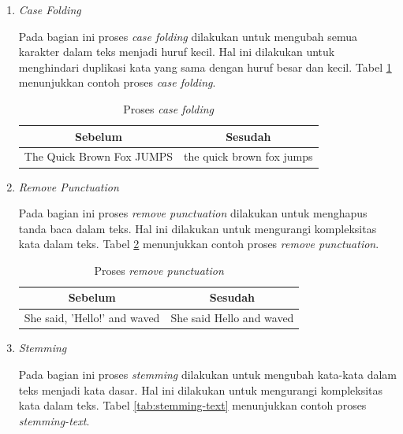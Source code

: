 \begin{enumerate}

\item{\textit{Case Folding}}

\par Pada bagian ini proses \textit{case folding} dilakukan untuk mengubah semua karakter dalam teks menjadi huruf kecil. Hal ini dilakukan untuk menghindari duplikasi kata yang sama dengan huruf besar dan kecil. Tabel \ref{tab:case-folding} menunjukkan contoh proses \textit{case folding}.

\begin{table}[H]
    \centering
    \caption{Proses \textit{case folding}}
    \label{tab:case-folding}
    \begin{tabular}{|l|l|}
    \hline
    \multicolumn{1}{|c|}{\textbf{Sebelum}} & \multicolumn{1}{c|}{\textbf{Sesudah}} \\ \hline
    The Quick Brown Fox JUMPS              & the quick brown fox jumps             \\ \hline
    \end{tabular}
\end{table}


\item{\textit{Remove Punctuation}}

\par Pada bagian ini proses \textit{remove punctuation} dilakukan untuk menghapus tanda baca dalam teks. Hal ini dilakukan untuk mengurangi kompleksitas kata dalam teks. Tabel \ref{tab:remove-punctuation} menunjukkan contoh proses \textit{remove punctuation}.

\begin{table}[H]
    \centering
    \caption{Proses \textit{remove punctuation}}
    \label{tab:remove-punctuation}
    \begin{tabular}{|l|l|}
    \hline
    \multicolumn{1}{|c|}{\textbf{Sebelum}} & \multicolumn{1}{c|}{\textbf{Sesudah}} \\ \hline
    She said, 'Hello!' and waved           & She said Hello and waved              \\ \hline
    \end{tabular}
\end{table}

\item{\textit{Stemming}}

\par Pada bagian ini proses \textit{stemming} dilakukan untuk mengubah kata-kata dalam teks menjadi kata dasar. Hal ini dilakukan untuk mengurangi kompleksitas kata dalam teks. Tabel \ref{tab:stemming-text} menunjukkan contoh proses \textit{stemming-text}.


\end{enumerate}
